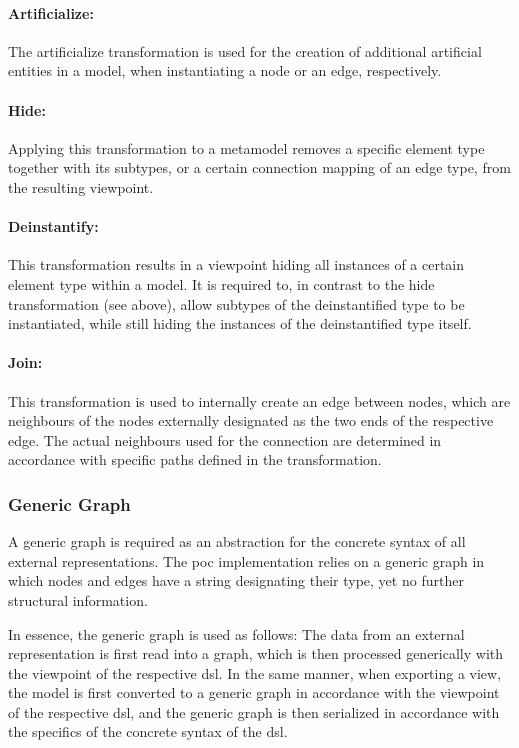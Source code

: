 \paragraph{Artificialize:} The artificialize transformation is used for the creation of additional artificial entities in a model, when instantiating a node or an edge, respectively.

\paragraph{Hide:} Applying this transformation to a metamodel removes a specific element type together with its subtypes, or a certain connection mapping of an edge type, from the resulting viewpoint.

\paragraph{Deinstantify:} This transformation results in a viewpoint hiding all instances of a certain element type within a model. It is required to, in contrast to the hide transformation (see above), allow subtypes of the deinstantified type to be instantiated, while still hiding the instances of the deinstantified type itself.

\paragraph{Join:} This transformation is used to internally create an edge between nodes, which are neighbours of the nodes externally designated as the two ends of the respective edge. The actual neighbours used for the connection are determined in accordance with specific paths defined in the transformation.

\subsubsection{Generic Graph}

A generic graph is required as an abstraction for the concrete syntax of all external representations. The \gls{poc} implementation relies on a generic graph in which nodes and edges have a string designating their type, yet no further structural information.

In essence, the generic graph is used as follows: The data from an external representation is first read into a graph, which is then processed generically with the viewpoint of the respective \gls{dsl}. In the same manner, when exporting a view, the model is first converted to a generic graph in accordance with the viewpoint of the respective \gls{dsl}, and the generic graph is then serialized in accordance with the specifics of the concrete syntax of the \gls{dsl}.

